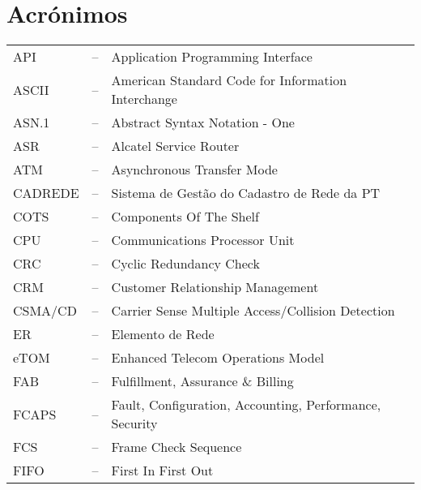 \label{Acronym}
\section*{Acrónimos}
\vspace{1cm}
\begin{tabular}{ l c l }
	API	& –	\hspace{1cm} & Application Programming Interface \\
	ASCII & – \hspace{1cm} &	American Standard Code for Information Interchange \\
	ASN.1 & – \hspace{1cm} & Abstract Syntax Notation - One \\
	ASR & –	\hspace{1cm} & Alcatel Service Router \\
	ATM & – \hspace{1cm} & Asynchronous Transfer Mode \\
	CADREDE & –	\hspace{1cm} & Sistema de Gestão do Cadastro de Rede da PT \\
	COTS & – \hspace{1cm} &Components Of The Shelf \\
	CPU	& – \hspace{1cm} & Communications Processor Unit \\
	CRC & – \hspace{1cm} & Cyclic Redundancy Check \\
	CRM & – \hspace{1cm} & Customer Relationship Management \\
	CSMA/CD & – \hspace{1cm} & Carrier Sense Multiple Access/Collision Detection \\
	ER & – \hspace{1cm} & Elemento de Rede \\
	eTOM & – \hspace{1cm} & Enhanced Telecom Operations Model \\
	FAB & – \hspace{1cm} & Fulfillment, Assurance \& Billing \\
	FCAPS & – \hspace{1cm} & Fault, Configuration, Accounting, Performance, Security \\
	FCS & – \hspace{1cm} & Frame Check Sequence \\
	FIFO & – \hspace{1cm} & First In First Out \\
\end{tabular}
